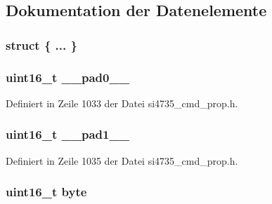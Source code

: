 \subsection{Dokumentation der Datenelemente}
\hypertarget{unionfm__hicut__cutoff__freq_abe8f57244f62d605922ef2aeedd83560}{}\subsubsection[{"@125}]{\setlength{\rightskip}{0pt plus 5cm}struct \{ ... \} }\label{unionfm__hicut__cutoff__freq_abe8f57244f62d605922ef2aeedd83560}
\hypertarget{unionfm__hicut__cutoff__freq_a77132c2c26a75f5b8751b235cda23828}{}
\subsubsection[{\+\_\+\+\_\+pad0\+\_\+\+\_\+}]{\setlength{\rightskip}{0pt plus 5cm}uint16\+\_\+t \+\_\+\+\_\+pad0\+\_\+\+\_\+}\label{unionfm__hicut__cutoff__freq_a77132c2c26a75f5b8751b235cda23828}


Definiert in Zeile 1033 der Datei si4735\+\_\+cmd\+\_\+prop.\+h.

\hypertarget{unionfm__hicut__cutoff__freq_ab72e3a1f2f7db8695c60c658f5a0f11a}{}
\subsubsection[{\+\_\+\+\_\+pad1\+\_\+\+\_\+}]{\setlength{\rightskip}{0pt plus 5cm}uint16\+\_\+t \+\_\+\+\_\+pad1\+\_\+\+\_\+}\label{unionfm__hicut__cutoff__freq_ab72e3a1f2f7db8695c60c658f5a0f11a}


Definiert in Zeile 1035 der Datei si4735\+\_\+cmd\+\_\+prop.\+h.

\hypertarget{unionfm__hicut__cutoff__freq_ab0549c1b5ea980a02e7eab77e21fea49}{}
\subsubsection[{byte}]{\setlength{\rightskip}{0pt plus 5cm}uint16\+\_\+t byte}\label{unionfm__hicut__cutoff__freq_ab0549c1b5ea980a02e7eab77e21fea49}


